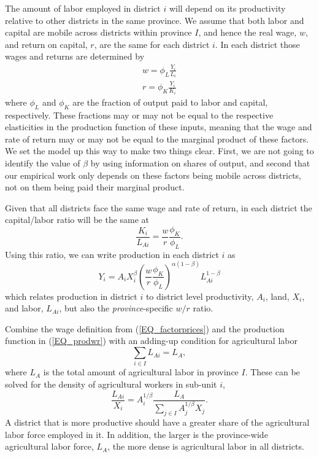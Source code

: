 \documentclass[11pt]{article}
\begin{document}
The amount of labor employed in district $i$ will depend on its productivity relative to other districts in the same province. We assume that both labor and capital are mobile across districts within province $I$, and hence the real wage, $w$, and return on capital, $r$, are the same for each district $i$. In each district those wages and returns are determined by
\begin{eqnarray}
    w = \phi_L \frac{Y_i}{L_i} \\ \nonumber
    r = \phi_K \frac{Y_i}{K_i} \label{EQ_factorprices}
\end{eqnarray}
where $\phi_L$ and $\phi_K$ are the fraction of output paid to labor and capital, respectively. These fractions may or may not be equal to the respective elasticities in the production function of these inputs, meaning that the wage and rate of return may or may not be equal to the marginal product of these factors. We set the model up this way to make two things clear. First, we are not going to identify the value of $\beta$ by using information on shares of output, and second that our empirical work only depends on these factors being mobile across districts, not on them being paid their marginal product.

Given that all districts face the same wage and rate of return, in each district the capital/labor ratio will be the same at
\begin{equation}
    \frac{K_i}{L_{Ai}} = \frac{w}{r}\frac{\phi_K}{\phi_L}. \nonumber
\end{equation}
Using this ratio, we can write production in each district $i$ as
\begin{equation}
Y_{i} = A_{i} X_{i}^{\beta} \left(\frac{w}{r}\frac{\phi_K}{\phi_L}\right)^{\alpha(1-\beta)} L_{Ai}^{1-\beta} \label{EQ_prodwr}
\end{equation}
which relates production in district $i$ to district level productivity, $A_i$, land, $X_i$, and labor, $L_{Ai}$, but also the \textit{province}-specific $w/r$ ratio.

Combine the wage definition from (\ref{EQ_factorprices}) and the production function in (\ref{EQ_prodwr}) with an adding-up condition for agricultural labor 
\begin{equation}
\sum_{i\in I} L_{Ai} = L_A, \nonumber
\end{equation}
where $L_A$ is the total amount of agricultural labor in province $I$. These can be solved for the density of agricultural workers in sub-unit $i$,
\begin{equation}
\frac{L_{Ai}}{X_i} = A_{i}^{1/\beta}\frac{L_A}{\sum_{j\in I} A_{j}^{1/\beta}X_{j}}. \label{EQ_LaX}
\end{equation}
A district that is more productive should have a greater share of the agricultural labor force employed in it. In addition, the larger is the province-wide agricultural labor force, $L_A$, the more dense is agricultural labor in all districts.
\end{document}
